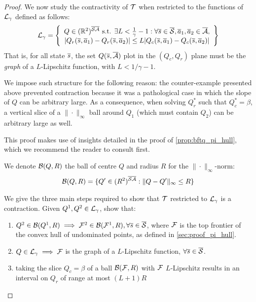 \begin{proof}
We now study the contractivity of $\mathcal{T}$ when restricted to the functions of $\mathcal{L}_\gamma$ defined as follows:
\begin{equation}
    \mathcal{L}_\gamma = \left\{\begin{array}{cc}
         Q\in(\mathbb{R}^2)^{\overline{\mathcal{S}}\overline{\mathcal{A}}}\text{ s.t. }\exists L<\frac{1}{\gamma}-1: \forall \overline{s}\in\overline{\mathcal{S}},\overline{a}_1,\overline{a}_2\in\overline{\mathcal{A}},   \\
         |Q_r(\overline{s},\overline{a}_1) - Q_r(\overline{s},\overline{a}_2)| \leq L|Q_c(\overline{s},\overline{a}_1) - Q_c(\overline{s},\overline{a}_2)|
    \end{array}\right\}
\end{equation}
That is, for all state $\overline{s}$, the set $Q(\overline{s}, \overline{\mathcal{A}})$ plot in the $(Q_c,Q_r)$ plane must be the \emph{graph} of a $L$-Lipschitz function, with $L<1/\gamma-1$.

We impose such structure for the following reason: the counter-example presented above prevented contraction because it was a pathological case in which the slope of $Q$ can be arbitrary large. As a consequence, when solving $Q_r^*$ such that $Q_c^*=\beta$, a vertical slice of a $\|\cdot\|_\infty$ ball around $Q_1$ (which must contain $Q_2$) can be arbitrary large as well.

This proof makes use of insights detailed in the proof of \autoref{prop:bftq_pi_hull}, which we recommend the reader to consult first.

We denote $\mathcal{B}(Q,R)$ the ball of centre $Q$ and radius $R$ for the $\|\cdot\|_\infty$-norm:
\begin{equation*}
    \mathcal{B}(Q,R) = \{Q'\in(R^2)^{\overline{\mathcal{S}}\overline{\mathcal{A}}}: \|Q-Q'\|_\infty \leq R\}
\end{equation*}

We give the three main steps required to show that $\mathcal{T}$ restricted to $\mathcal{L}_\gamma$ is a contraction. Given $Q^1, Q^2\in\mathcal{L}_\gamma$, show that:
\begin{enumerate}
    \item $Q^2\in\mathcal{B}(Q^1,R)\implies\mathcal{F}^2\in\mathcal{B}(\mathcal{F}^1, R), \forall\overline{s}\in\overline{\mathcal{S}}$, where $\mathcal{F}$ is the top frontier of the convex hull of undominated points, as defined in \autoref{sec:proof_pi_hull}.
    \item $Q\in\mathcal{L}_\gamma \implies \mathcal{F}$ is the graph of a $L$-Lipschitz function, $\forall\overline{s}\in\overline{\mathcal{S}}$.
    \item taking the slice $Q_c=\beta$ of a ball $\mathcal{B}(\mathcal{F},R)$ with $\mathcal{F}$ $L$-Lipschitz results in an interval on $Q_r$ of range at most $(L+1)R$
\end{enumerate}


\end{proof}
